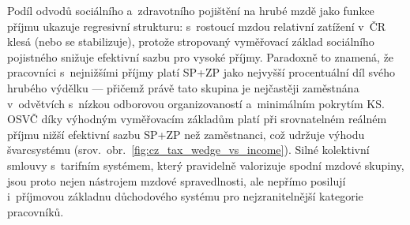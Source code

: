 Podíl odvodů sociálního a~zdravotního pojištění na hrubé mzdě jako funkce příjmu ukazuje regresivní strukturu: s~rostoucí mzdou relativní zatížení v~ČR klesá (nebo se stabilizuje), protože stropovaný vyměřovací základ sociálního pojistného snižuje efektivní sazbu pro vysoké příjmy.
Paradoxně to znamená, že pracovníci s~nejnižšími příjmy platí \ac{SP}+\ac{ZP} jako nejvyšší procentuální díl svého hrubého výdělku --- přičemž právě tato skupina je nejčastěji zaměstnána v~odvětvích s~nízkou odborovou organizovaností a~minimálním pokrytím \ac{KS}.
\ac{OSVČ} díky výhodným vyměřovacím základům platí při srovnatelném reálném příjmu nižší efektivní sazbu \ac{SP}+\ac{ZP} než zaměstnanci, což udržuje výhodu švarcsystému (srov.~obr.~\ref{fig:cz_tax_wedge_vs_income}).
Silné kolektivní smlouvy s~tarifním systémem, který pravidelně valorizuje spodní mzdové skupiny, jsou proto nejen nástrojem mzdové spravedlnosti, ale nepřímo posilují i~příjmovou základnu důchodového systému pro nejzranitelnější kategorie pracovníků.


